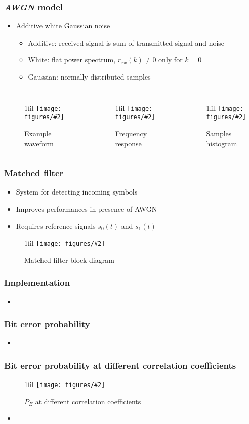 \documentclass{beamer}
\makeatletter
\newcommand*{\centerfloat}{%
  \parindent \z@
  \leftskip \z@ \@plus 1fil \@minus \textwidth
  \rightskip\leftskip
  \parfillskip \z@skip}
\newcommand{\fig}[3]{
  \begin{figure}[H]
  \centerfloat
    \texttt{[image: figures/\#2]}
	\caption{#3}
  \end{figure}
}
\makeatother
\begin{document}
\begin{frame}
	\frametitle{\emph{AWGN} model}
	\begin{itemize}
		\item Additive white Gaussian noise
		\begin{itemize}
			\item Additive: received signal is sum of transmitted signal and noise
			\item White: flat power spectrum, $r_{xx}(k) \neq 0$ only for $k = 0$
			\item Gaussian: normally-distributed samples
		\end{itemize}
	\end{itemize}
	\begin{columns}
			\fig{2.75cm}{awgn_n.png}{Example waveform}
			\fig{2.75cm}{awgn_f.png}{Frequency response}
			\fig{2.75cm}{awgn_h.png}{Samples histogram}
	\end{columns}
\end{frame}

\begin{frame}
	\frametitle{Matched filter}
	\begin{itemize}
		\item System for detecting incoming symbols
		\item Improves performances in presence of AWGN
		\item Requires reference signals $s_0(t)$ and $s_1(t)$
	\end{itemize}
	\fig{4cm}{mf_block.png}{Matched filter block diagram}
\end{frame}

\begin{frame}
	\frametitle{Implementation}
	\begin{itemize}
		\item
	\end{itemize}
\end{frame}

\begin{frame}
	\frametitle{Bit error probability}
	\begin{itemize}
		\item
	\end{itemize}
\end{frame}

\begin{frame}
	\frametitle{Bit error probability at different correlation coefficients}
	\fig{4cm}{pe_r12.png}{$P_E$ at different correlation coefficients}
	\begin{itemize}
		\item
	\end{itemize}
\end{frame}
\end{document}
